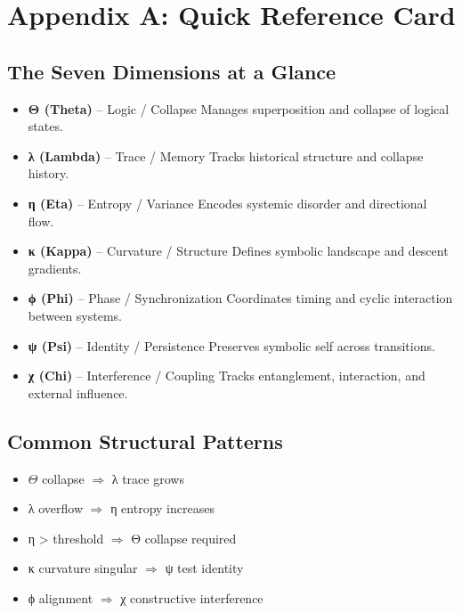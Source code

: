 
\chapter*{Appendix A: Quick Reference Card}

\section*{The Seven Dimensions at a Glance}

\begin{itemize}
\item \textbf{Θ (Theta)} – Logic / Collapse  
Manages superposition and collapse of logical states.

\item \textbf{λ (Lambda)} – Trace / Memory  
Tracks historical structure and collapse history.

\item \textbf{η (Eta)} – Entropy / Variance  
Encodes systemic disorder and directional flow.

\item \textbf{κ (Kappa)} – Curvature / Structure  
Defines symbolic landscape and descent gradients.

\item \textbf{ϕ (Phi)} – Phase / Synchronization  
Coordinates timing and cyclic interaction between systems.

\item \textbf{ψ (Psi)} – Identity / Persistence  
Preserves symbolic self across transitions.

\item \textbf{χ (Chi)} – Interference / Coupling  
Tracks entanglement, interaction, and external influence.
\end{itemize}

\section*{Common Structural Patterns}

\begin{itemize}
\item $\Theta$ collapse $\Rightarrow$ λ trace grows
\item λ overflow $\Rightarrow$ η entropy increases
\item η > threshold $\Rightarrow$ Θ collapse required
\item κ curvature singular $\Rightarrow$ ψ test identity
\item ϕ alignment $\Rightarrow$ χ constructive interference
\end{itemize}

